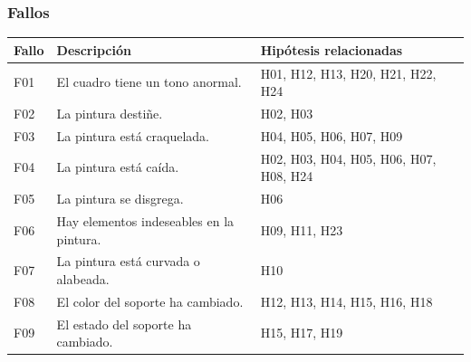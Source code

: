 \documentclass[a4paper,11pt]{article}
\begin{document}
			\subsubsection{Fallos}
			\begin{center}
				\begin{tabular}{| p{2cm} | p{6cm} | p{3cm} |}
					\hline
					\cellcolor[RGB]{224,233,250}\textbf{Fallo} &
					\cellcolor[RGB]{224,233,250}\textbf{Descripción} &
					\cellcolor[RGB]{224,233,250}\textbf{Hipótesis relacionadas}\\
					\hline
					F01 & El cuadro tiene un tono anormal. & H01, H12, H13, H20, H21, H22,
					H24\\
					\hline
					F02 & La pintura destiñe. & H02, H03\\
					\hline
					F03 & La pintura está craquelada. &
					H04, H05, H06, H07, H09\\
					\hline
					F04 & La pintura está caída. &
					H02, H03, H04, H05, H06, H07, H08, H24\\
					\hline
					F05 & La pintura se disgrega. & H06\\
					\hline
					F06 & Hay elementos indeseables en la pintura. &
					H09, H11, H23\\
					\hline
					F07 & La pintura está curvada o alabeada. & H10\\
					\hline
					F08 & El color del soporte ha cambiado. &
					H12, H13, H14, H15, H16, H18\\
					\hline
					F09 & El estado del soporte ha cambiado. & H15, H17, H19\\
					\hline
				\end{tabular}
			\end{center}
			\newpage
\end{document}
